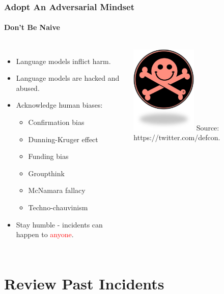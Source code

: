 \documentclass[11pt,
               aspectratio=169,
               hyperref={colorlinks}
               ]{beamer}
\begin{document}
		\begin{frame}
			
			\frametitle{Adopt An Adversarial Mindset}
			\framesubtitle{Don't Be Naive}
			
			\begin{columns}
				\vspace{-5pt}
				\begin{itemize}
					\item Language models inflict harm.				
					\item Language models are hacked and abused.		
					\item Acknowledge human biases:
						\begin{itemize}
							\item Confirmation bias
							\item Dunning-Kruger effect
							\item Funding bias
							\item Groupthink
							\item McNamara fallacy
							\item Techno-chauvinism
						\end{itemize}
					\item Stay humble - incidents can happen to \textcolor{red}{anyone}.
				\end{itemize}
				\centering
				\includegraphics[height=120pt]{../img/defcon.jpg}
				\newline
				\small{Source: https://twitter.com/defcon.}
			\end{columns}
					
		\end{frame}
		

	\section{Review Past Incidents}
\end{document}
